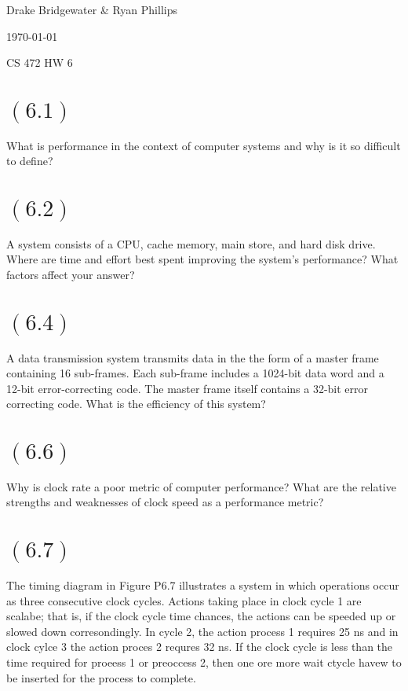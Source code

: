 \documentclass[letterpaper,12pt,titlepage]{article}
\def\name{Drake Bridgewater \& Ryan Phillips}
\begin{document}
\hfill \name

\hfill \today

\hfill CS 472 HW 6


\section*{$(6.1)$} What is performance in the context of computer systems and why is it so difficult to define?

\begin{mdframed}[style=MyFrame]
\end{mdframed}

\section*{$(6.2)$} A system consists of a CPU, cache memory, main store, and hard disk drive. Where are time and effort best spent improving the system's performance? What factors affect your answer?

\begin{mdframed}[style=MyFrame]
\end{mdframed}

\section*{$(6.4)$} A data transmission system transmits data in the the form of a master frame containing 16 sub-frames. Each sub-frame includes a 1024-bit data word and a 12-bit error-correcting code. The master frame itself contains a 32-bit error correcting code. What is the efficiency of this system?

\begin{mdframed}[style=MyFrame]
\end{mdframed}

\section*{$(6.6)$} Why is clock rate a poor metric of computer performance? What are the relative strengths and weaknesses of clock speed as a performance metric?

\begin{mdframed}[style=MyFrame]
\end{mdframed}

\section*{$(6.7)$} The timing diagram in Figure P6.7 illustrates a system in which operations occur as three consecutive clock cycles. Actions taking place in clock cycle 1 are scalabe; that is, if the clock cycle time chances, the actions can be speeded up or slowed down corresondingly. In cycle 2, the action process 1 requires 25 ns and in clock cylce 3 the action proces 2 requres 32 ns. If the clock cycle is less than the time required for proeess 1 or preoccess 2, then one ore more wait ctycle havew to be inserted for the process to complete.
\end{document}
